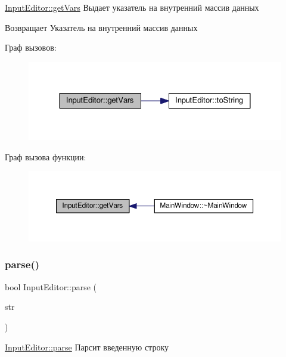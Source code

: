 \hyperlink{class_input_editor_a3f69e5b7fe43e31f2a4f783fbdc8072e}{Input\+Editor\+::get\+Vars} Выдает указатель на внутренний массив данных 

\begin{DoxyReturn}{Возвращает}
Указатель на внутренний массив данных 
\end{DoxyReturn}
Граф вызовов\+:\nopagebreak
\begin{figure}[H]
\begin{center}
\leavevmode
\includegraphics[width=324pt]{class_input_editor_a3f69e5b7fe43e31f2a4f783fbdc8072e_cgraph}
\end{center}
\end{figure}
Граф вызова функции\+:\nopagebreak
\begin{figure}[H]
\begin{center}
\leavevmode
\includegraphics[width=350pt]{class_input_editor_a3f69e5b7fe43e31f2a4f783fbdc8072e_icgraph}
\end{center}
\end{figure}
\mbox{\label{class_input_editor_ad9a9e03d439e909c6d72775ef78d9814}} 
\subsubsection{\texorpdfstring{parse()}{parse()}}
{\footnotesize\ttfamily bool Input\+Editor\+::parse (\begin{DoxyParamCaption}\item[{const Q\+String \&}]{str }\end{DoxyParamCaption})}



\hyperlink{class_input_editor_ad9a9e03d439e909c6d72775ef78d9814}{Input\+Editor\+::parse} Парсит введенную строку 


